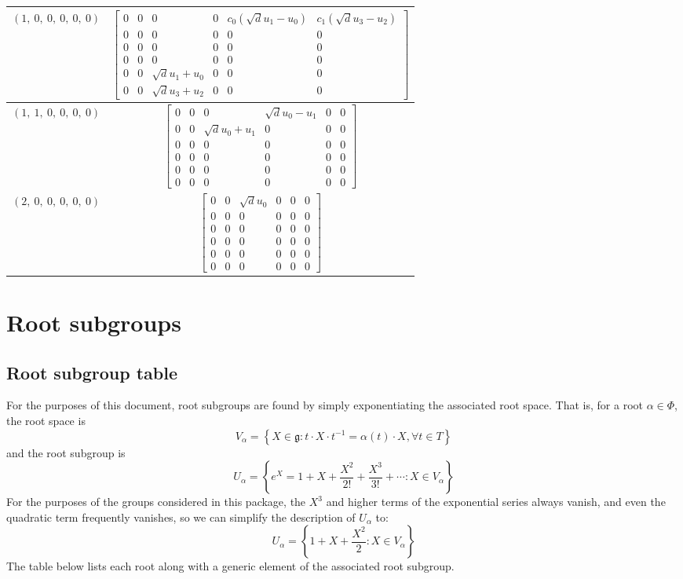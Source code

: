 \documentclass[11pt]{article}
\newcommand{\noi}{\noindent}
\newcommand{\inv}{^{-1}}
\newcommand{\lb}{\left\{}
\newcommand{\rb}{\right\}}
\newcommand{\frakg}{\mathfrak{g}}
\theoremstyle{definition}
\begin{document}
\begin{longtable}{|l|c|}
    \hline
    $\left( 1, \  0, \  0, \  0, \  0, \  0\right)$ & ${\left[\begin{matrix}0 & 0 & 0 & 0 & c_{0} \left(\sqrt{d} u_{1} - u_{0}\right) & c_{1} \left(\sqrt{d} u_{3} - u_{2}\right)\\0 & 0 & 0 & 0 & 0 & 0\\0 & 0 & 0 & 0 & 0 & 0\\0 & 0 & 0 & 0 & 0 & 0\\0 & 0 & \sqrt{d} u_{1} + u_{0} & 0 & 0 & 0\\0 & 0 & \sqrt{d} u_{3} + u_{2} & 0 & 0 & 0\end{matrix}\right]}$ \\
    \hline
    $\left( 1, \  1, \  0, \  0, \  0, \  0\right)$ & ${\left[\begin{matrix}0 & 0 & 0 & \sqrt{d} u_{0} - u_{1} & 0 & 0\\0 & 0 & \sqrt{d} u_{0} + u_{1} & 0 & 0 & 0\\0 & 0 & 0 & 0 & 0 & 0\\0 & 0 & 0 & 0 & 0 & 0\\0 & 0 & 0 & 0 & 0 & 0\\0 & 0 & 0 & 0 & 0 & 0\end{matrix}\right]}$ \\
    \hline
    $\left( 2, \  0, \  0, \  0, \  0, \  0\right)$ & ${\left[\begin{matrix}0 & 0 & \sqrt{d} u_{0} & 0 & 0 & 0\\0 & 0 & 0 & 0 & 0 & 0\\0 & 0 & 0 & 0 & 0 & 0\\0 & 0 & 0 & 0 & 0 & 0\\0 & 0 & 0 & 0 & 0 & 0\\0 & 0 & 0 & 0 & 0 & 0\end{matrix}\right]}$ \\
    \hline
\end{longtable}


\newpage
\section{Root subgroups}

\subsection{Root subgroup table}

\noi For the purposes of this document, root subgroups are found by simply exponentiating the associated root space. That is, for a root $\alpha \in \Phi$, the root space is
\[
	V_\alpha = \lb X \in \frakg : t \cdot X \cdot t \inv = \alpha(t) \cdot X, \forall t \in T \rb
\]
and the root subgroup is
\[
	U_\alpha = \lb e^X = 1 + X + \frac{X^2}{2!} + \frac{X^3}{3!} + \cdots : X \in V_\alpha \rb
\]
For the purposes of the groups considered in this package, the $X^3$ and higher terms of the exponential series always vanish, and even the quadratic term frequently vanishes, so we can simplify the description of $U_\alpha$ to:
\[
	U_\alpha = \lb 1 + X + \frac{X^2}{2} : X \in V_\alpha \rb
\]
The table below lists each root along with a generic element of the associated root subgroup.
\end{document}
